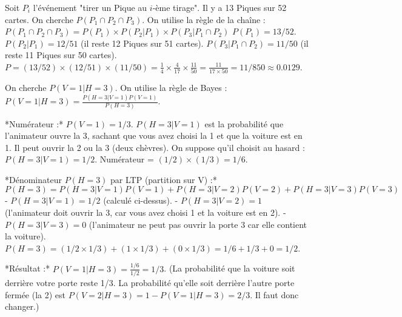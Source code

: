 
\begin{correctionbox}
Soit $P_i$ l'événement "tirer un Pique au $i$-ème tirage". Il y a 13 Piques sur 52 cartes.
On cherche $P(P_1 \cap P_2 \cap P_3)$. On utilise la règle de la chaîne :
$P(P_1 \cap P_2 \cap P_3) = P(P_1) \times P(P_2|P_1) \times P(P_3|P_1 \cap P_2)$
$P(P_1) = 13/52$.
$P(P_2|P_1) = 12/51$ (il reste 12 Piques sur 51 cartes).
$P(P_3|P_1 \cap P_2) = 11/50$ (il reste 11 Piques sur 50 cartes).
$P = (13/52) \times (12/51) \times (11/50) = \frac{1}{4} \times \frac{4}{17} \times \frac{11}{50} = \frac{11}{17 \times 50} = 11/850 \approx 0.0129$.
\end{correctionbox}

\begin{correctionbox}
On cherche $P(V=1 | H=3)$. On utilise la règle de Bayes :
$P(V=1 | H=3) = \frac{P(H=3 | V=1) P(V=1)}{P(H=3)}$.

*Numérateur :* $P(V=1) = 1/3$. $P(H=3 | V=1)$ est la probabilité que l'animateur ouvre la 3, sachant que vous avez choisi la 1 et que la voiture est en 1. Il peut ouvrir la 2 ou la 3 (deux chèvres). On suppose qu'il choisit au hasard : $P(H=3 | V=1) = 1/2$.
Numérateur = $(1/2) \times (1/3) = 1/6$.

*Dénominateur $P(H=3)$ par LTP (partition sur V) :*
$P(H=3) = P(H=3|V=1)P(V=1) + P(H=3|V=2)P(V=2) + P(H=3|V=3)P(V=3)$
- $P(H=3|V=1) = 1/2$ (calculé ci-dessus).
- $P(H=3|V=2) = 1$ (l'animateur doit ouvrir la 3, car vous avez choisi 1 et la voiture est en 2).
- $P(H=3|V=3) = 0$ (l'animateur ne peut pas ouvrir la porte 3 car elle contient la voiture).
$P(H=3) = (1/2 \times 1/3) + (1 \times 1/3) + (0 \times 1/3) = 1/6 + 1/3 + 0 = 1/2$.

*Résultat :* $P(V=1 | H=3) = \frac{1/6}{1/2} = 1/3$.
(La probabilité que la voiture soit derrière votre porte reste 1/3. La probabilité qu'elle soit derrière l'autre porte fermée (la 2) est $P(V=2|H=3) = 1 - P(V=1|H=3) = 2/3$. Il faut donc changer.)
\end{correctionbox}

